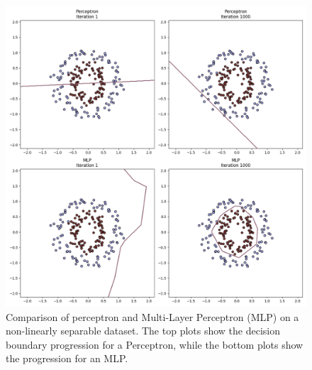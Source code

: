 \documentclass[english,11pt,a4paper,titlepage]{article}
\begin{document}
	\begin{figure}[h]
		\centering
		\includegraphics[width=0.8\linewidth]{img/perceptron_vs_mlp.png}
		\caption{Comparison of perceptron and Multi-Layer Perceptron (MLP) on a non-linearly separable dataset. The top plots show the decision boundary progression for a Perceptron, while the bottom plots show the progression for an MLP.}
		\label{fig:perceptron_vs_mlp}
	\end{figure}
	
\end{document}
